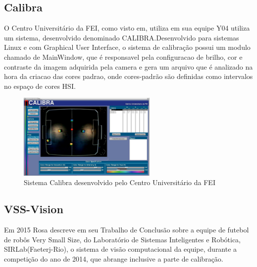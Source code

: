 \subsection{Calibra}
O Centro Universitário da FEI, como visto em\cite{PenharbelTime}, utiliza em sua equipe Y04 utiliza um sistema, desenvolvido denominado CALIBRA\cite{Penharbel:2004}.Desenvolvido para sistemas Linux e com Graphical User Interface\cite{Penharbel:2004}, o sistema de calibração possui um modulo chamado de MainWindow, que é responsavel pela configuracao de brilho, cor e contraste da imagem adquirida pela camera e gera um arquivo que é analizado na hora da criacao das cores padrao\cite{PenharbelTime}, onde cores-padrão são definidas como intervalos no espaço de cores HSI\cite{PenharbelTime}.

\begin{figure}[!h]
	\centering
	\includegraphics[width=0.6\textwidth]{calibra.pdf}
	\caption{Sistema Calibra desenvolvido pelo Centro Universitário da FEI \cite{Penharbel:2004}}
	\label{Calibra}
\end{figure}

\subsection{VSS-Vision}

Em 2015 Rosa\cite{Rosa:2015} descreve em seu Trabalho de Conclusão sobre a equipe de futebol de rob\^os Very Small Size, do Laboratório de Sistemas Inteligentes e Robótica, SIRLab(Faeterj-Rio), o sistema de visão computacional da equipe, durante a competição do ano de 2014, que abrange inclusive a parte de calibração. 

